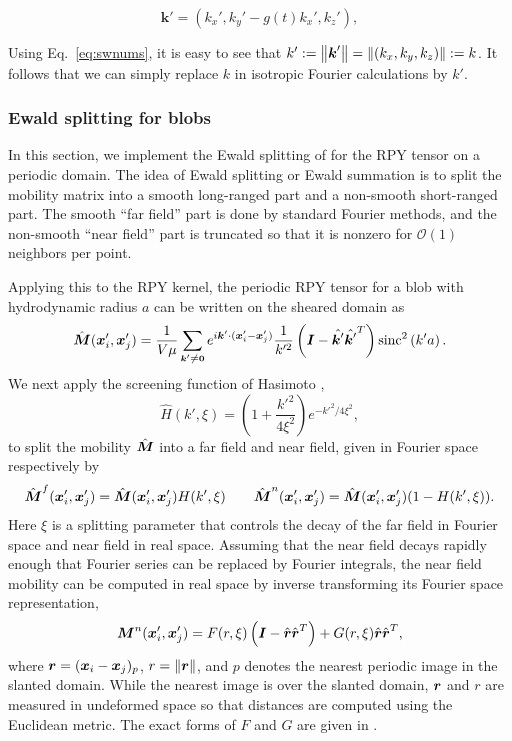 \begin{equation}
\label{eq:kprime}
\bm{k}'= (k_x',k_y'-g(t)k_x',k_z'), 
\end{equation}

Using Eq.\ \eqref{eq:swnums}, it is easy to see that $k':=\left\Vert \boldsymbol{k}'\right\Vert=\left\Vert (k_x,k_y,k_z)\right\Vert:=k$. It follows that we can simply replace $k$ in isotropic Fourier calculations by $k'$. 

\subsubsection{Ewald splitting for blobs \label{sec:ewblob}}
In this section, we implement the Ewald splitting of \cite{PSRPY} for the RPY tensor on a periodic domain. The idea of Ewald splitting or Ewald summation is to split the mobility matrix into a smooth long-ranged part and a non-smooth short-ranged part. The smooth ``far field'' part is done by standard Fourier methods, and the non-smooth ``near field'' part is truncated so that it is nonzero for $\mathcal{O}(1)$ neighbors per point. 

Applying this to the RPY kernel, the periodic RPY tensor for a blob with hydrodynamic radius $a$ can be written on the sheared domain as
\begin{equation}
\hat{\boldsymbol{M}}(\boldsymbol{x}_i',\boldsymbol{x}_j')=\frac{1}{V\mu}\sum_{\small{\boldsymbol{k}'\neq \boldsymbol{0}}} e^{i\boldsymbol{k}' \cdot (\boldsymbol{x}'_i-\boldsymbol{x}'_j)} \frac{1}{k'^2}\left(\boldsymbol{I}-\hat{\boldsymbol{k}'}\hat{\boldsymbol{k}'}^T\right)\text{sinc}^2\left(k'a\right).  
\end{equation} 
We next apply the screening function of Hasimoto \cite{Hsplit},
\begin{equation}
\label{eq:HspE}
\hat{H}(k',\xi)=\left(1+\frac{k'^2}{4\xi^2}\right)e^{-k'^2/4\xi^2}, 
\end{equation}
to split the mobility $\hat{\boldsymbol{M}}$ into a far field and near field, given in Fourier space respectively by
\begin{equation}
\hat{\boldsymbol{M}}^f (\boldsymbol{x}_i',\boldsymbol{x}_j')= \hat{\boldsymbol{M}} (\boldsymbol{x}_i',\boldsymbol{x}_j') H(k',\xi) \qquad \hat{\boldsymbol{M}}^n (\boldsymbol{x}_i',\boldsymbol{x}_j') = \hat{\boldsymbol{M}} (\boldsymbol{x}_i',\boldsymbol{x}_j') (1-H(k',\xi)). 
\end{equation}
Here $\xi$ is a splitting parameter that controls the decay of the far field in Fourier space and near field in real space. Assuming that the near field decays rapidly enough that Fourier series can be replaced by Fourier integrals, the near field mobility can be computed in real space by inverse transforming its Fourier space representation,
\begin{equation}
\label{eq:nearRPY}
\boldsymbol{M}^n(\boldsymbol{x}_i',\boldsymbol{x}_j')=F(r,\xi)\left(\boldsymbol{I}-\hat{\boldsymbol{r}}\hat{\boldsymbol{r}}^T\right)+G(r,\xi)\hat{\boldsymbol{r}}\hat{\boldsymbol{r}}^T, 
\end{equation}
where $\boldsymbol{r}=(\boldsymbol{x}_i-\boldsymbol{x}_j)_p$, $r=\left\Vert \boldsymbol{r}\right\Vert$, and $p$ denotes the nearest periodic image in the slanted domain. While the nearest image is over the slanted domain, $\boldsymbol{r}$ and $r$ are measured in undeformed space so that distances are computed using the Euclidean metric. The exact forms of $F$ and $G$ are given in \cite[Appendix~A]{PSRPY}.

